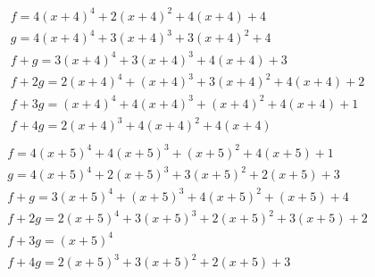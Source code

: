 \documentclass[bibliography=totoc, a4paper, 12pt]{extarticle}
\begin{document}
$$\begin{array}{l}
f = 4(x+4)^4 + 2(x+4)^2 + 4(x+4) + 4\\
g = 4(x+4)^4 + 3(x+4)^3 + 3(x+4)^2 + 4\\
f + g = 3(x+4)^4 + 3(x+4)^3 + 4(x+4) + 3\\
f + 2g = 2(x+4)^4 + (x+4)^3 + 3(x+4)^2 + 4(x+4) + 2\\
f + 3g = (x+4)^4 + 4(x+4)^3 + (x+4)^2 + 4(x+4) + 1\\
f + 4g = 2(x+4)^3 + 4(x+4)^2 + 4(x+4)\\
\end{array}$$
$$\begin{array}{l}
f = 4(x+5)^4 + 4(x+5)^3 + (x+5)^2 + 4(x+5) + 1\\
g = 4(x+5)^4 + 2(x+5)^3 + 3(x+5)^2 + 2(x+5) + 3\\
f + g = 3(x+5)^4 + (x+5)^3 + 4(x+5)^2 + (x+5) + 4\\
f + 2g = 2(x+5)^4 + 3(x+5)^3 + 2(x+5)^2 + 3(x+5) + 2\\
f + 3g = (x+5)^4\\
f + 4g = 2(x+5)^3 + 3(x+5)^2 + 2(x+5) + 3\\
\end{array}$$
\end{document}
